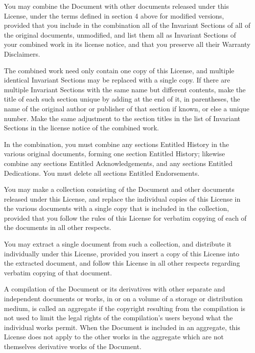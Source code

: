 \begin{BookLicense}
You may combine the Document with other documents released under this License, under the terms defined in section 4 above for modified versions, provided that you include in the combination all of the Invariant Sections of all of the original documents, unmodified, and list them all as Invariant Sections of your combined work in its license notice, and that you preserve all their Warranty Disclaimers.

The combined work need only contain one copy of this License, and multiple identical Invariant Sections may be replaced with a single copy. If there are multiple Invariant Sections with the same name but different contents, make the title of each such section unique by adding at the end of it, in parentheses, the name of the original author or publisher of that section if known, or else a unique number. Make the same adjustment to the section titles in the list of Invariant Sections in the license notice of the combined work.

In the combination, you must combine any sections Entitled \BookQuoteChar{}History\BookQuoteChar{} in the various original documents, forming one section Entitled \BookQuoteChar{}History\BookQuoteChar{}; likewise combine any sections Entitled \BookQuoteChar{}Acknowledgements\BookQuoteChar{}, and any sections Entitled \BookQuoteChar{}Dedications\BookQuoteChar{}. You must delete all sections Entitled \BookQuoteChar{}Endorsements\BookQuoteChar{}.

You may make a collection consisting of the Document and other documents released under this License, and replace the individual copies of this License in the various documents with a single copy that is included in the collection, provided that you follow the rules of this License for verbatim copying of each of the documents in all other respects.

You may extract a single document from such a collection, and distribute it individually under this License, provided you insert a copy of this License into the extracted document, and follow this License in all other respects regarding verbatim copying of that document.

A compilation of the Document or its derivatives with other separate and independent documents or works, in or on a volume of a storage or distribution medium, is called an \BookQuoteChar{}aggregate\BookQuoteChar{} if the copyright resulting from the compilation is not used to limit the legal rights of the compilation's users beyond what the individual works permit. When the Document is included in an aggregate, this License does not apply to the other works in the aggregate which are not themselves derivative works of the Document.


\end{BookLicense}

